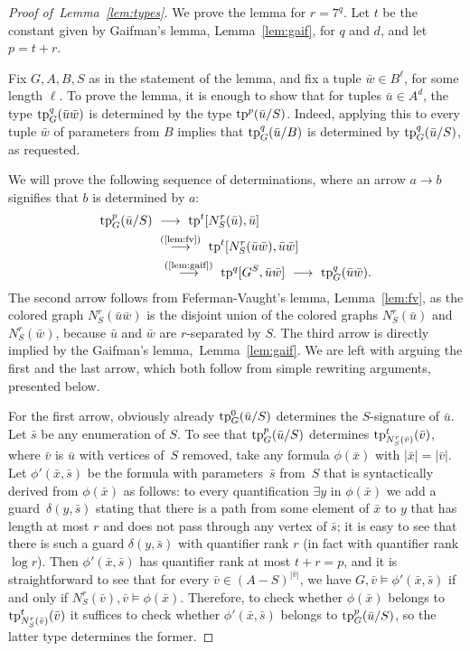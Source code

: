 \begin{proof}[Proof of~Lemma~\ref{lem:types}]
We prove the lemma for $r=7^q$.
Let $t$ be the constant given by Gaifman's lemma, Lemma~\ref{lem:gaif}, for $q$ and $d$, and let $p=t+r$.

Fix $G,A,B,S$ as in the statement of the lemma, and fix a tuple $\bar w\in B^\ell$, for some length $\ell$.
To prove the lemma, it is enough to show that
for tuples $\bar u\in A^d$,
the type $\mathrm{tp}^q_G(\bar u\bar w)$ is determined by the type $\mathrm{tp}^p(\bar u/S)$.
Indeed, applying this to every tuple $\bar w$ of parameters from $B$ implies that $\mathrm{tp}^q_G(\bar u/B)$ is determined by $\mathrm{tp}^q_G(\bar u/S)$, as requested.

We will prove the following sequence of determinations,
where an arrow $a\rightarrow b$ signifies that $b$ is determined by $a$:
\begin{align*}
	\tp^p_G(\bar u/S)
  \ & \longrightarrow\ 
	\tp^{t}[N^r_S(\bar u), \bar u]
  \ \\ &\stackrel{\textrm{(\ref{lem:fv})}}{\longrightarrow}\ 
	\tp^{t}[N^r_S(\bar u\bar w), \bar u\bar w] \\ &\ \stackrel{\textrm{(\ref{lem:gaif})}}\longrightarrow\ 
	\tp^q[G^S, \bar u\bar w] \ \longrightarrow\ 
	\tp^q_G(\bar u\bar w).
\end{align*}
The second arrow follows from Feferman-Vaught's lemma, Lemma~\ref{lem:fv},
as the colored graph $N^r_S(\bar u\bar w)$
is the disjoint union of the colored graphs 
$N^r_S(\bar u)$ and $N^r_S(\bar w)$,
because $\bar u$ and $\bar w$ are $r$-separated by $S$.
The third arrow is directly implied by the Gaifman's lemma,~Lemma~\ref{lem:gaif}.
We are left with arguing the first and the last arrow, which both follow from simple rewriting arguments, presented below.

\medskip
For the first arrow, obviously already $\mathrm{tp}^0_G(\bar u/S)$ determines the $S$-signature of $\bar u$. Let $\bar s$ be any enumeration of $S$.
To see that $\mathrm{tp}^p_G(\bar u/S)$ determines $\mathrm{tp}^{t}_{N^r_S(\bar v)}(\bar v)$, where $\bar v$ is $\bar u$ with vertices of~$S$ removed, take any formula $\phi(\bar x)$ with $|\bar x|=|\bar v|$.
Let $\phi'(\bar x,\bar s)$ be the formula with parameters~$\bar s$ from~$S$ that is syntactically derived from $\phi(\bar x)$ as follows: 
to every quantification $\exists y$ in $\phi(\bar x)$ we add a guard~$\delta(y,\bar s)$ stating that there is a path from some element of $\bar x$ to $y$ that has length at most $r$ and does not pass through
any vertex of $\bar s$; it is easy to see that there is such a guard $\delta(y,\bar s)$ with quantifier rank $r$ (in fact with quantifier rank $\log r$).
Then $\phi'(\bar x,\bar s)$ has quantifier rank at most $t+r=p$, and it is straightforward to see that for every $\bar v\in (A-S)^{|\bar v|}$, we have $G,\bar v\models \phi'(\bar x,\bar s)$ if and only if
$N^r_S(\bar v),\bar v\models \phi(\bar x)$. Therefore, to check whether $\phi(\bar x)$ belongs to $\mathrm{tp}^{t}_{N^r_S(\bar v)}(\bar v)$ it suffices to check 
whether $\phi'(\bar x,\bar s)$ belongs to $\mathrm{tp}^p_G(\bar u/S)$, so the latter type determines the former.


\end{proof}
